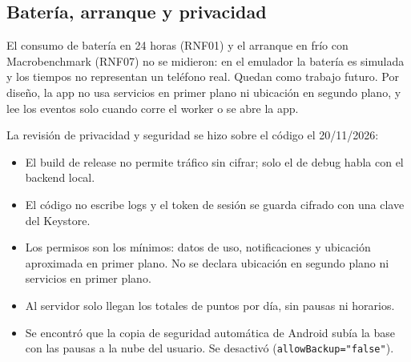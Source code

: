 \subsection{Batería, arranque y privacidad}

El consumo de batería en 24 horas (RNF01) y el arranque en frío con Macrobenchmark (RNF07) no se
midieron: en el emulador la batería es simulada y los tiempos no representan un teléfono real. Quedan como
trabajo futuro. Por diseño, la app no usa servicios en primer plano ni ubicación en segundo plano, y lee
los eventos solo cuando corre el worker o se abre la app.

La revisión de privacidad y seguridad se hizo sobre el código el 20/11/2026:

\begin{itemize}
\item El build de release no permite tráfico sin cifrar; solo el de debug habla con el backend local.
\item El código no escribe logs y el token de sesión se guarda cifrado con una clave del Keystore.
\item Los permisos son los mínimos: datos de uso, notificaciones y ubicación aproximada en primer plano.
No se declara ubicación en segundo plano ni servicios en primer plano.
\item Al servidor solo llegan los totales de puntos por día, sin pausas ni horarios.
\item Se encontró que la copia de seguridad automática de Android subía la base con las pausas a la nube
del usuario. Se desactivó (\texttt{allowBackup="false"}).
\end{itemize}
